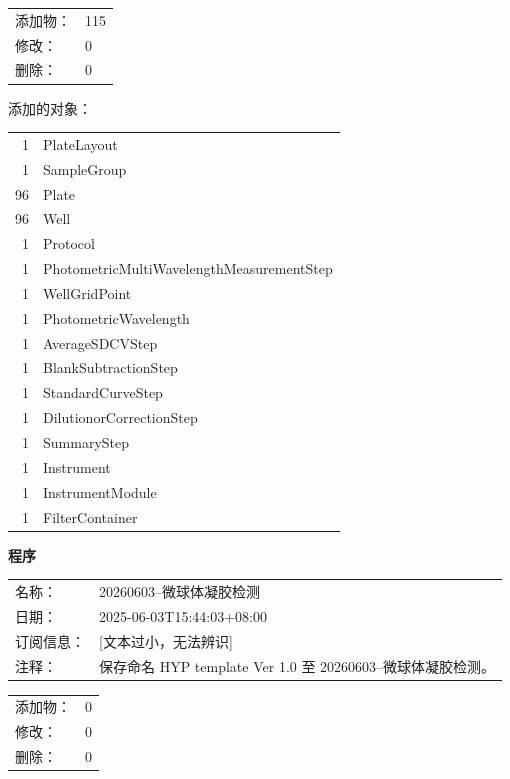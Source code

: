 \documentclass[UTF8,10pt,a4paper,fontset=fandol]{ctexart}
\begin{document}
\vspace{0.4em}

\begin{tabular}{@{}p{2.2cm}p{11cm}@{}}
添加物： & 115\\
修改： & 0\\
删除： & 0\\
\end{tabular}

\vspace{0.4em}

\noindent
添加的对象：

\begin{tabular}{@{}r@{\quad}l@{}}
1 & PlateLayout\\
1 & SampleGroup\\
96 & Plate\\
96 & Well\\
1 & Protocol\\
1 & PhotometricMultiWavelengthMeasurementStep\\
1 & WellGridPoint\\
1 & PhotometricWavelength\\
1 & AverageSDCVStep\\
1 & BlankSubtractionStep\\
1 & StandardCurveStep\\
1 & DilutionorCorrectionStep\\
1 & SummaryStep\\
1 & Instrument\\
1 & InstrumentModule\\
1 & FilterContainer\\
\end{tabular}

\vspace{0.6em}

\noindent
\textbf{程序}

\begin{tabular}{@{}p{2.2cm}p{11cm}@{}}
名称： & 20260603--微球体凝胶检测\\
日期： & 2025-06-03T15:44:03+08:00\\
订阅信息： & [文本过小，无法辨识]\\
注释： & 保存命名 HYP template Ver 1.0 至 20260603--微球体凝胶检测。\\
\end{tabular}

\vspace{0.4em}

\begin{tabular}{@{}p{2.2cm}p{11cm}@{}}
添加物： & 0\\
修改： & 0\\
删除： & 0\\
\end{tabular}
\end{document}
